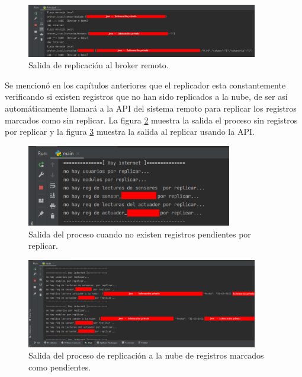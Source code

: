 \begin{figure}[htpb]
\centering 
\includegraphics[width=0.9\textwidth]{./Figures/test/replicador/enviabroker.png}
\caption{Salida de replicación al broker remoto.}
\label{fig:envia2}
\end{figure}

Se mencionó en los capítulos anteriores que el replicador esta constantemente verificando si existen registros que no han sido replicados a la nube, de ser así automáticamente llamará a la API del sistema remoto para replicar los registros marcados como sin replicar. La figura \ref{fig:r1} muestra la salida el proceso sin registros por replicar y la figura \ref{fig:r2} muestra la salida al replicar usando la API. 

\begin{figure}[htpb]
\centering 
\includegraphics[width=0.8\textwidth]{./Figures/test/replicador/sinReplicar1.png}
\caption{Salida del proceso cuando no existen registros pendientes por replicar.}
\label{fig:r1}
\end{figure}

\begin{figure}[htpb]
\centering 
\includegraphics[width=0.9\textwidth]{./Figures/test/replicador/sinReplicar2.png}
\caption{Salida del proceso de replicación a la nube de registros marcados como pendientes.}
\label{fig:r2}
\end{figure}


